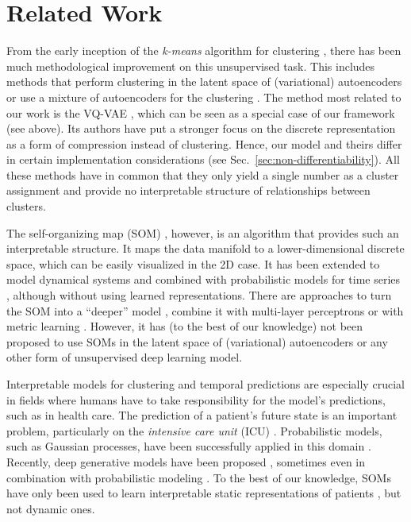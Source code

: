 \section{Related Work}

From the early inception of the \emph{k-means} algorithm for clustering \citep{Lloyd1982}, there has been much methodological improvement on this unsupervised task.
This includes methods that perform clustering in the latent space of (variational) autoencoders \citep{Aljalbout2018} or use a mixture of autoencoders for the clustering \citep{Zhang2017a, Locatello2018}.
The method most related to our work is the VQ-VAE \citep{Oord2017}, which can be seen as a special case of our framework (see above).
Its authors have put a stronger focus on the discrete representation as a form of compression instead of clustering.
Hence, our model and theirs differ in certain implementation considerations (see Sec.\ \ref{sec:non-differentiability}).
All these methods have in common that they only yield a single number as a cluster assignment and provide no interpretable structure of relationships between clusters.

The self-organizing map (SOM) \citep{Kohonen1998}, however, is an algorithm that provides such an interpretable structure.
It maps the data manifold to a lower-dimensional discrete space, which can be easily visualized in the 2D case.
It has been extended to model dynamical systems \citep{Barreto2004} and combined with probabilistic models for time series \citep{Sang2008}, although without using learned representations.
There are approaches to turn the SOM into a ``deeper'' model \citep{Dittenbach2000}, combine it with multi-layer perceptrons \citep{Furukawa2005} or with metric learning \citep{Ponski2014}.
However, it has (to the best of our knowledge) not been proposed to use SOMs in the latent space of (variational) autoencoders or any other form of unsupervised deep learning model.

Interpretable models for clustering and temporal predictions are especially crucial in fields where humans have to take responsibility for the model's predictions, such as in health care.
The prediction of a patient's future state is an important problem, particularly on the \emph{intensive care unit} (ICU) \citep{Harutyunyan2017, Badawi2018}.
Probabilistic models, such as Gaussian processes, have been successfully applied in this domain \citep{Colopy2016, Schulam2016}.
Recently, deep generative models have been proposed \citep{Hyland2017}, sometimes even in combination with probabilistic modeling \citep{Lim2018}.
To the best of our knowledge, SOMs have only been used to learn interpretable static representations of patients \citep{Tirunagari2015}, but not dynamic ones.